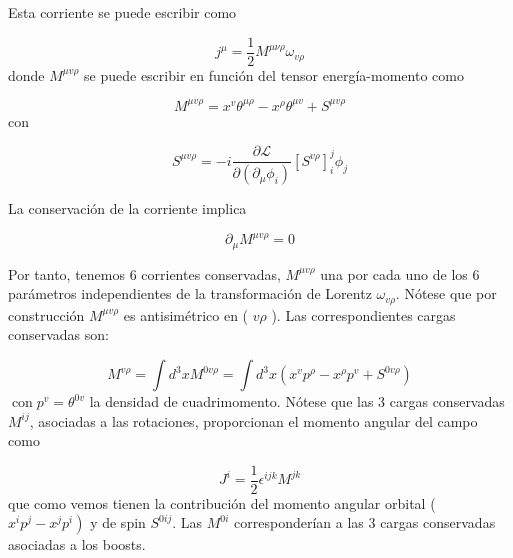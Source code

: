 Esta corriente se puede escribir como

\begin{equation*}
j^{\mu}=\frac{1}{2} M^{\mu \nu \rho} \omega_{v \rho} \tag{3.72}
\end{equation*}
donde $M^{\mu v \rho}$ se puede escribir en función del tensor energía-momento como

\begin{equation*}
M^{\mu v \rho}=x^{v} \theta^{\mu \rho}-x^{\rho} \theta^{\mu v}+S^{\mu v \rho} \tag{3.73}
\end{equation*}
con

\begin{equation*}
S^{\mu v \rho}=-i \frac{\partial \mathscr{L}}{\partial\left(\partial_{\mu} \phi_{i}\right)}\left[S^{v \rho}\right]_{i}^{j} \phi_{j} \tag{3.74}
\end{equation*}

La conservación de la corriente implica

\begin{equation*}
\partial_{\mu} M^{\mu v \rho}=0 \tag{3.75}
\end{equation*}

Por tanto, tenemos 6 corrientes conservadas, $M^{\mu v \rho}$ una por cada uno de los 6 parámetros independientes de la transformación de Lorentz $\omega_{v \rho}$. Nótese que por construcción $M^{\mu v \rho}$ es antisimétrico en ( $v \rho$ ). Las correspondientes cargas conservadas son:

\begin{equation*}
M^{v \rho}=\int d^{3} x M^{0 v \rho}=\int d^{3} x\left(x^{v} p^{\rho}-x^{\rho} p^{v}+S^{0 v \rho}\right) \tag{3.76}
\end{equation*}
$\operatorname{con} p^{v}=\theta^{0 v}$ la densidad de cuadrimomento.
Nótese que las 3 cargas conservadas $M^{i j}$, asociadas a las rotaciones, proporcionan el momento angular del campo como

\begin{equation*}
J^{i}=\frac{1}{2} \epsilon^{i j k} M^{j k} \tag{3.77}
\end{equation*}
que como vemos tienen la contribución del momento angular orbital ( $\left.x^{i} p^{j}-x^{j} p^{i}\right)$ y de spin $S^{0 i j}$. Las $M^{0 i}$ corresponderían a las 3 cargas conservadas asociadas a los boosts.